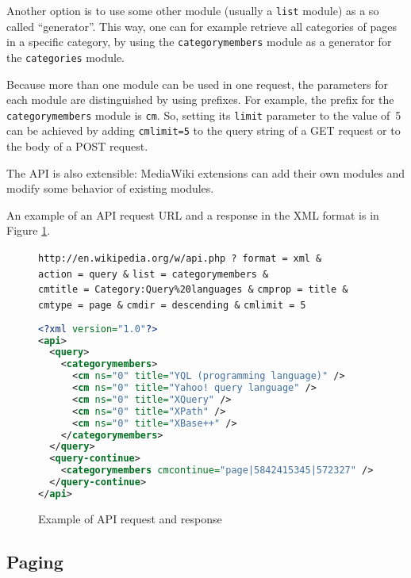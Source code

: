 Another option is to use some other module (usually a \texttt{list} module) as a so called “generator”.
This way, one can for example retrieve all categories of pages in a specific category,
by using the \texttt{categorymembers} module as a generator for the \texttt{categories} module.

Because more than one module can be used in one request,
the parameters for each module are distinguished by using prefixes.
For example, the prefix for the \texttt{categorymembers} module is \texttt{cm}.
So, setting its \texttt{limit} parameter to the value of~5 can be achieved by
adding \texttt{cmlimit=5} to the query string of a GET request or to the body of a POST request.

The \ac{API} is also extensible: MediaWiki extensions can add their own modules and modify some behavior of existing modules.

An example of an \ac{API} request \ac{URL} and a response in the \ac{XML} format is in Figure \ref{API example}.

\begin{figure}[htbp]
\texttt{http://en.wikipedia.org/w/api.php}~\texttt{?}\
\texttt{format}~\texttt{=}~\texttt{xml}~\texttt{\&}
\texttt{action}~\texttt{=}~\texttt{query}~\texttt{\&}
\texttt{list}~\texttt{=}~\texttt{categorymembers}~\texttt{\&}
\texttt{cmtitle}~\texttt{=}~\texttt{Category:Query\%20languages}~\texttt{\&}
\texttt{cmprop}~\texttt{=}~\texttt{title}~\texttt{\&}
\texttt{cmtype}~\texttt{=}~\texttt{page}~\texttt{\&}
\texttt{cmdir}~\texttt{=}~\texttt{descending}~\texttt{\&}
\texttt{cmlimit}~\texttt{=}~\texttt{5}

\begin{lstlisting}[language=xml]
<?xml version="1.0"?>
<api>
  <query>
    <categorymembers>
      <cm ns="0" title="YQL (programming language)" />
      <cm ns="0" title="Yahoo! query language" />
      <cm ns="0" title="XQuery" />
      <cm ns="0" title="XPath" />
      <cm ns="0" title="XBase++" />
    </categorymembers>
  </query>
  <query-continue>
    <categorymembers cmcontinue="page|5842415345|572327" />
  </query-continue>
</api>
\end{lstlisting}

\caption{Example of \ac{API} request and response}
\label{API example}
\end{figure}

\subsection{Paging}
\label{mw paging}

